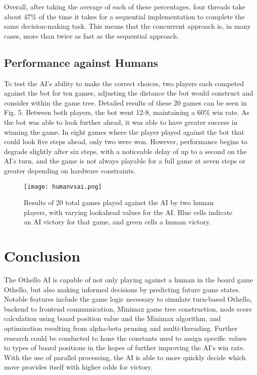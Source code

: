 \documentclass[conference]{IEEEtran}
\begin{document}
Overall, after taking the average of each of these percentages, four threads take about 47\% of the time it takes for a sequential implementation to complete the same decision-making task. This means that the concurrent approach is, in many cases, more than twice as fast as the sequential approach.

\subsection{Performance against Humans}
To test the AI’s ability to make the correct choices, two players each competed against the bot for ten games, adjusting the distance the bot would construct and consider within the game tree. Detailed results of these 20 games can be seen in Fig. 5. Between both players, the bot went 12-8, maintaining a 60\% win rate. As the bot was able to look further ahead, it was able to have greater success in winning the game. In eight games where the player played against the bot that could look five steps ahead, only two were won. However, performance begins to degrade slightly after six steps, with a noticeable delay of up to a second on the AI’s turn, and the game is not always playable for a full game at seven steps or greater depending on hardware constraints.  


\begin{figure}[htbp]
\centerline{\texttt{[image: humanvsai.png]}}
\caption{Results of 20 total games played against the AI by two human players, with varying lookahead values for the AI. Blue cells indicate an AI victory for that game, and green cells a human victory.}
\label{fig}
\end{figure}


\section{Conclusion}
The Othello AI is capable of not only playing against a human in the board game Othello, but also making informed decisions by predicting future game states. Notable features include the game logic necessary to simulate turn-based Othello, backend to frontend communication, Minimax game tree construction, node score calculation using board position value and the Minimax algorithm, and optimization resulting from alpha-beta pruning and multi-threading. Further research could be conducted to hone the constants used to assign specific values to types of board positions in the hopes of further improving the AI’s win rate. With the use of parallel processing, the AI is able to more quickly decide which move provides itself with higher odds for victory.
\end{document}
